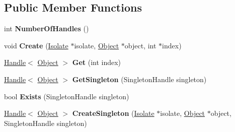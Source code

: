 \subsection*{Public Member Functions}
\begin{DoxyCompactItemize}
\item 
int {\bfseries Number\+Of\+Handles} ()\hypertarget{classv8_1_1internal_1_1_eternal_handles_a2831b3a300390e2cb714f4dc1909d46b}{}\label{classv8_1_1internal_1_1_eternal_handles_a2831b3a300390e2cb714f4dc1909d46b}

\item 
void {\bfseries Create} (\hyperlink{classv8_1_1internal_1_1_isolate}{Isolate} $\ast$isolate, \hyperlink{classv8_1_1internal_1_1_object}{Object} $\ast$object, int $\ast$index)\hypertarget{classv8_1_1internal_1_1_eternal_handles_acf384364f5e06b605be609f0323b6c9a}{}\label{classv8_1_1internal_1_1_eternal_handles_acf384364f5e06b605be609f0323b6c9a}

\item 
\hyperlink{classv8_1_1internal_1_1_handle}{Handle}$<$ \hyperlink{classv8_1_1internal_1_1_object}{Object} $>$ {\bfseries Get} (int index)\hypertarget{classv8_1_1internal_1_1_eternal_handles_a5ddad5d646481d8b7a3bd966ad44d2f7}{}\label{classv8_1_1internal_1_1_eternal_handles_a5ddad5d646481d8b7a3bd966ad44d2f7}

\item 
\hyperlink{classv8_1_1internal_1_1_handle}{Handle}$<$ \hyperlink{classv8_1_1internal_1_1_object}{Object} $>$ {\bfseries Get\+Singleton} (Singleton\+Handle singleton)\hypertarget{classv8_1_1internal_1_1_eternal_handles_af981c2866ed0a695436eea4c437d0fc4}{}\label{classv8_1_1internal_1_1_eternal_handles_af981c2866ed0a695436eea4c437d0fc4}

\item 
bool {\bfseries Exists} (Singleton\+Handle singleton)\hypertarget{classv8_1_1internal_1_1_eternal_handles_a00bf7bf1b63a9f22de5385e7c8bccf2a}{}\label{classv8_1_1internal_1_1_eternal_handles_a00bf7bf1b63a9f22de5385e7c8bccf2a}

\item 
\hyperlink{classv8_1_1internal_1_1_handle}{Handle}$<$ \hyperlink{classv8_1_1internal_1_1_object}{Object} $>$ {\bfseries Create\+Singleton} (\hyperlink{classv8_1_1internal_1_1_isolate}{Isolate} $\ast$isolate, \hyperlink{classv8_1_1internal_1_1_object}{Object} $\ast$object, Singleton\+Handle singleton)\hypertarget{classv8_1_1internal_1_1_eternal_handles_a1e9372860584dde0598dc98500184d12}{}\label{classv8_1_1internal_1_1_eternal_handles_a1e9372860584dde0598dc98500184d12}


\end{DoxyCompactItemize}
